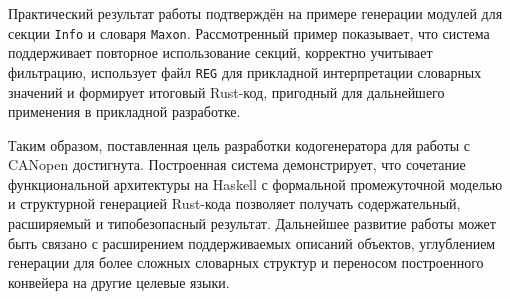 \documentclass[a4paper,12pt]{article}
\begin{document}
Практический результат работы подтверждён на примере генерации модулей для секции
\texttt{Info} и словаря \texttt{Maxon}. Рассмотренный пример показывает, что система
поддерживает повторное использование секций, корректно учитывает фильтрацию, использует
файл \texttt{REG} для прикладной интерпретации словарных значений и формирует итоговый
Rust-код, пригодный для дальнейшего применения в прикладной разработке.

Таким образом, поставленная цель разработки кодогенератора для работы с CANopen
достигнута. Построенная система демонстрирует, что сочетание функциональной
архитектуры на Haskell с формальной промежуточной моделью и структурной генерацией
Rust-кода позволяет получать содержательный, расширяемый и типобезопасный результат.
Дальнейшее развитие работы может быть связано с расширением поддерживаемых описаний
объектов, углублением генерации для более сложных словарных структур и переносом
построенного конвейера на другие целевые языки.

\pagebreak

\printbibliography

\pagebreak

\renewcommand{\appendixpagename}{\centering Приложения}
\end{document}
